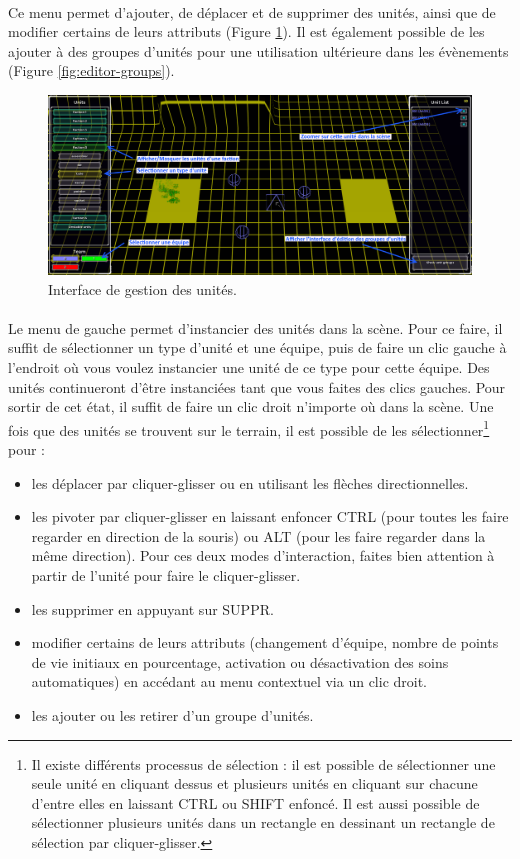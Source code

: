 \documentclass[a4paper]{article}
\begin{document}
\paragraph{ }
Ce menu permet d'ajouter, de déplacer et de supprimer des unités, ainsi que de modifier certains de leurs attributs (Figure \ref{fig:editor-units}). Il est également possible de les ajouter à des groupes d'unités pour une utilisation ultérieure dans les évènements (Figure \ref{fig:editor-groups}).
\begin{figure}[H]
\centering
\includegraphics[width=\linewidth]{editor-units.png}
\caption{Interface de gestion des unités.}
\label{fig:editor-units}
\end{figure}
\paragraph{ }
Le menu de gauche permet d'instancier des unités dans la scène. Pour ce faire, il suffit de sélectionner un type d'unité et une équipe, puis de faire un clic gauche à l'endroit où vous voulez instancier une unité de ce type pour cette équipe. Des unités continueront d'être instanciées tant que vous faites des clics gauches. Pour sortir de cet état, il suffit de faire un clic droit n'importe où dans la scène. Une fois que des unités se trouvent sur le terrain, il est possible de les sélectionner\footnote{Il existe différents processus de sélection : il est possible de sélectionner une seule unité en cliquant dessus et plusieurs unités en cliquant sur chacune d'entre elles en laissant CTRL ou SHIFT enfoncé. Il est aussi possible de sélectionner plusieurs unités dans un rectangle en dessinant un rectangle de sélection par cliquer-glisser.} pour :
\begin{itemize}
\item les déplacer par cliquer-glisser ou en utilisant les flèches directionnelles.
\item les pivoter par cliquer-glisser en laissant enfoncer CTRL (pour toutes les faire regarder en direction de la souris) ou ALT (pour les faire regarder dans la même direction). Pour ces deux modes d'interaction, faites bien attention à partir de l'unité pour faire le cliquer-glisser. 
\item les supprimer en appuyant sur SUPPR.
\item modifier certains de leurs attributs (changement d'équipe, nombre de points de vie initiaux en pourcentage, activation ou désactivation des soins automatiques) en accédant au menu contextuel via un clic droit.
\item les ajouter ou les retirer d'un groupe d'unités.
\end{itemize}
\end{document}
